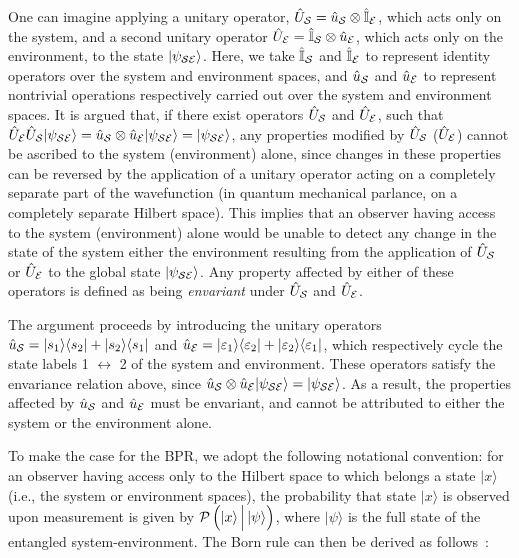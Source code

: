\documentclass[12pt]{iopart}
\begin{document}
One can imagine applying a unitary operator, $\hat{U}_{\cal{S}}=\hat{u}_{\cal{S}} \otimes \hat{\mathbb{I}}_{\cal{E}}$, which acts only on the system, and a second unitary operator $\hat{U}_{\cal{E}}=\hat{\mathbb{I}}_{\cal{S}} \otimes \hat{u}_{\cal{E}}$, which acts only on the environment, to the state $|\psi_{\cal SE}\rangle$. Here, we take $\hat{\mathbb{I}}_{\cal{S}}$ and $\hat{\mathbb{I}}_{\cal{E}}$ to represent identity operators over the system and environment spaces, and $\hat{u}_{\cal{S}}$ and $\hat{u}_{\cal{E}}$ to represent nontrivial operations respectively carried out over the system and environment spaces. It is argued that, if there exist operators $\hat{U}_{\cal{S}}$ and $\hat{U}_{\cal{E}}$, such that $\hat{U}_{\cal{E}} \hat{U}_{\cal{S}}|\psi_{\cal SE}\rangle=\hat{u}_{\cal{S}} \otimes \hat{u}_{\cal{E}}|\psi_{\cal SE}\rangle=|\psi_{\cal SE}\rangle$, any properties modified by $\hat{U}_{\cal{S}}$ ($\hat{U}_{\cal{E}}$) cannot be ascribed to the system (environment) alone, since changes in these properties can be reversed by the application of a unitary operator acting on a completely separate part of the wavefunction (in quantum mechanical parlance, on a completely separate Hilbert space). This implies that an observer having access to the system (environment) alone would be unable to detect any change in the state of the system either the environment resulting from the application of $\hat{U}_{\cal{S}}$ or $\hat{U}_{\cal{E}}$ to the global state $|\psi_{\cal SE}\rangle$. Any property affected by either of these operators is defined as being \textit{envariant} under $\hat{U}_{\cal{S}}$ and $\hat{U}_{\cal{E}}$. 

The argument proceeds by introducing the unitary  operators $\hat{u}_{\cal{S}}=|s_1\rangle\langle s_2| + |s_2 \rangle \langle s_1|$ and $\hat{u}_{\cal{E}}=|\varepsilon_1\rangle\langle \varepsilon_2| + |\varepsilon_2 \rangle \langle \varepsilon_1|$, which respectively cycle the state labels 1 $\longleftrightarrow$ 2 of the system and environment. These operators satisfy the envariance relation above, since $\hat{u}_{\cal S}\otimes\hat{u}_{\cal E} |\psi_{\cal SE}\rangle= |\psi_{\cal SE}\rangle$. As a result, the properties affected by $\hat{u}_{\cal S}$ and $\hat{u}_{\cal E}$ must be envariant, and cannot be attributed to either the system or the environment alone. 

To make the case for the BPR, we adopt the following notational convention: for an observer having access only to the Hilbert space to which belongs a state $|x\rangle$ (i.e., the system or environment spaces), the probability that state $|x\rangle$ is observed upon measurement is given by ${\cal P}\left(\left| x \right\rangle{\Big |}\left| \psi \right\rangle\right)$, where $|\psi\rangle$ is the full state of the entangled system-environment. The Born rule can then be derived as follows~\cite{zurek:05,schlosshauer:05b}:
\end{document}

